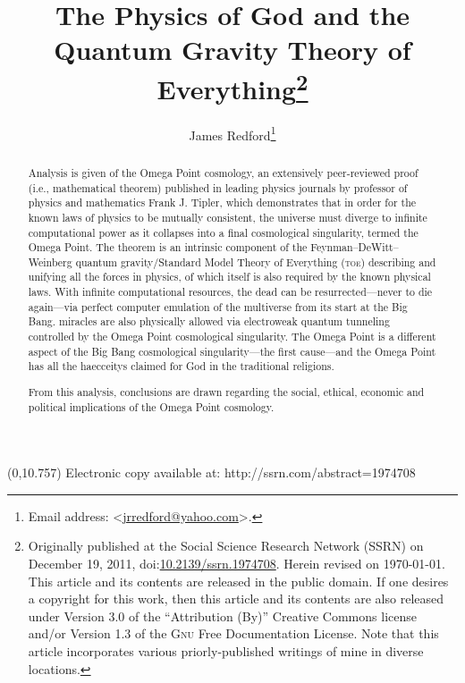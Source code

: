 \documentclass[letterpaper,12pt]{article}
\title{The Physics of God and the Quantum Gravity Theory of Everything\footnote{Originally published at the Social Science Research Network (SSRN) on December 19, 2011, doi:\discretionary{}{}{}\href{http://dx.doi.org/10.2139/ssrn.1974708}{10.2139/\dsc ssrn.1974708}\thinspace. Herein revised on \today . This article and its contents are released in the public domain. If one desires a copyright for this work, then this article and its contents are also released under Version 3.0 of the ``Attribution (By)'' Creative Commons license and\slash or Version 1.3 of the \textsc{Gnu} Free Documentation License. Note that this article incorporates various priorly-published writings of mine in diverse locations.}}
\author{James Redford\footnote{Email address: \textless\href{mailto:jrredford@yahoo.com}{jrredford@yahoo.com}\textgreater .}}
\begin{document}

\begin{textblock}{8.5}(0,10.757)%
\centering
{\selectfont\textcolor{GraySSRN}{Electronic copy available at: http://ssrn.com/abstract=1974708}}
\end{textblock}


\maketitle

\renewcommand{\abstractname}{\textsc{Abstract}}
\setlength{\absparindent}{0.5em}
\begin{abstract}
Analysis is given of the Omega Point cosmology, an extensively peer-reviewed proof (i.e., mathematical theorem) published in leading physics journals by professor of physics and mathematics Frank J. Tipler, which demonstrates that in order for the known laws of physics to be mutually consistent, the universe must diverge to infinite computational power as it collapses into a final cosmological singularity, termed the Omega Point. The theorem is an intrinsic component of the Feynman--DeWitt--Weinberg quantum gravity\slash Standard Model Theory of Everything (\textsc{toe}) describing and unifying all the forces in physics, of which itself is also required by the known physical laws. With infinite computational resources, the dead can be resurrected---never to die again---via perfect computer emulation of the multiverse from its start at the Big Bang. \Glspl{miracle} are also physically allowed via electroweak quantum tunneling controlled by the Omega Point cosmological singularity. The Omega Point is a different aspect of the Big Bang cosmological singularity---the first cause---and the Omega Point has all the \glspl{haecceity} claimed for God in the traditional religions.

\hspace{0.8em}From this analysis, conclusions are drawn regarding the social, ethical, economic and political implications of the Omega Point cosmology.
\end{abstract}
\end{document}
